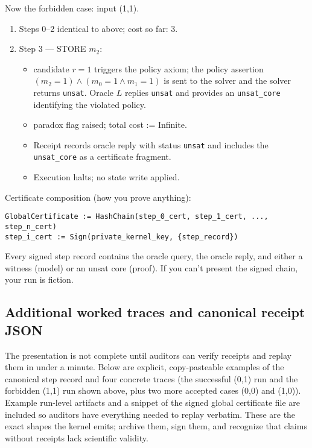 \documentclass[11pt]{article}
\begin{document}
Now the forbidden case: input (1,1).
\begin{enumerate}
  \item Steps 0--2 identical to above; cost so far: 3.
  \item Step 3 — STORE $m_2$:
    \begin{itemize}
      \item candidate $r = 1$ triggers the policy axiom; the policy assertion $(m_2 = 1) \land (m_0 = 1 \land m_1 = 1)$ is sent to the solver and the solver returns \texttt{unsat}. Oracle $L$ replies \texttt{unsat} and provides an \texttt{unsat\_core} identifying the violated policy.
      \item paradox flag raised; total cost := Infinite.
      \item Receipt records oracle reply with status \texttt{unsat} and includes the \texttt{unsat\_core} as a certificate fragment.
      \item Execution halts; no state write applied.
    \end{itemize}
\end{enumerate}

Certificate composition (how you prove anything):
\begin{verbatim}
GlobalCertificate := HashChain(step_0_cert, step_1_cert, ..., step_n_cert)
step_i_cert := Sign(private_kernel_key, {step_record})
\end{verbatim}
Every signed step record contains the oracle query, the oracle reply, and either a witness (model) or an unsat core (proof). If you can’t present the signed chain, your run is fiction.

\subsection{Additional worked traces and canonical receipt JSON}
The presentation is not complete until auditors can verify receipts and replay them in under a minute. Below are explicit, copy-pasteable examples of the canonical step record and four concrete traces (the successful (0,1) run and the forbidden (1,1) run shown above, plus two more accepted cases (0,0) and (1,0)). Example run-level artifacts and a snippet of the signed global certificate file are included so auditors have everything needed to replay verbatim. These are the exact shapes the kernel emits; archive them, sign them, and recognize that claims without receipts lack scientific validity.
\end{document}
